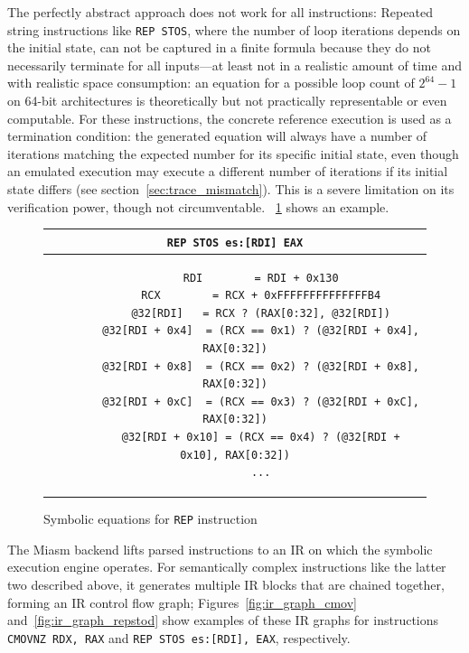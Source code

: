 The perfectly abstract approach does not work for all instructions: Repeated string instructions like \texttt{REP STOS},
where the number of loop iterations depends on the initial state, can not be captured in a finite formula because they
do not necessarily terminate for all inputs---at least not in a realistic amount of time and with realistic space
consumption: an equation for a possible loop count of $2^{64} - 1$ on 64-bit architectures is theoretically but not
practically representable or even computable. For these instructions, the concrete reference execution is used as a
termination condition: the generated equation will always have a number of iterations matching the expected number for
its specific initial state, even though an emulated execution may execute a different number of iterations if its
initial state differs (see section~\ref{sec:trace_mismatch}). This is a severe limitation on its verification power,
though not circumventable. \lstlistingname~\ref{fig:symb_equation_loop} shows an example.

\begin{figure}[htbp]
    \centering
    \begin{tabular}{c}
    \texttt{REP STOS es:[RDI] EAX} \\
    \midrule
    \begin{lstlisting}
        RDI        = RDI + 0x130
        RCX        = RCX + 0xFFFFFFFFFFFFFFB4
        @32[RDI]   = RCX ? (RAX[0:32], @32[RDI])
        @32[RDI + 0x4]  = (RCX == 0x1) ? (@32[RDI + 0x4],  RAX[0:32])
        @32[RDI + 0x8]  = (RCX == 0x2) ? (@32[RDI + 0x8],  RAX[0:32])
        @32[RDI + 0xC]  = (RCX == 0x3) ? (@32[RDI + 0xC],  RAX[0:32])
        @32[RDI + 0x10] = (RCX == 0x4) ? (@32[RDI + 0x10], RAX[0:32])
        ...
    \end{lstlisting}
    \end{tabular}
    \caption[]{Symbolic equations for \texttt{REP} instruction}\label{fig:symb_equation_loop}
\end{figure}

The Miasm backend lifts parsed instructions to an \ac{IR} on which the symbolic execution engine operates. For
semantically complex instructions like the latter two described above, it generates multiple \ac{IR} blocks that are
chained together, forming an \ac{IR} control flow graph; Figures~\ref{fig:ir_graph_cmov} and~\ref{fig:ir_graph_repstod}
show examples of these IR graphs for instructions \texttt{CMOVNZ RDX, RAX} and \texttt{REP STOS es:[RDI], EAX},
respectively.

